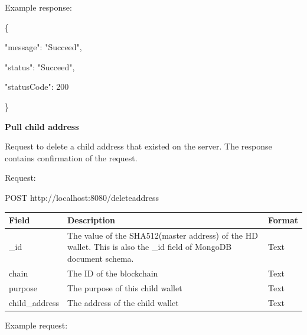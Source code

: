 Example response:

\begin{framed}
    \hspace*{13mm}        \{ \par
    \hspace*{13mm}                "message": "Succeed",    \par
    \hspace*{13mm}                "status": "Succeed",    \par
    \hspace*{13mm}             "statusCode": 200    \par
    \hspace*{13mm}                 \}    \par
\end{framed}


\bigskip
{\textbf{Pull child address }}
\bigskip

Request to delete a child address that existed on the server. The response contains confirmation of the request.

Request:

\begin{framed}
    POST http://localhost:8080/deleteaddress
\end{framed}

\begin{tabular}{m{3cm} m{9cm}  m{2.6cm}}
    \toprule
    Field & Description & Format                                            \\ 
    \midrule
    \_id & The value of the SHA512(master address) of the HD wallet. This is also the \_id field of MongoDB document schema.  & Text   \\ 
    chain   & The ID of the blockchain & Text    \\ 
    purpose   & The purpose of this child wallet & Text    \\ 
    child\_address   & The address of the child wallet & Text    \\ 
    \bottomrule

\end{tabular}
\bigskip

Example request:

